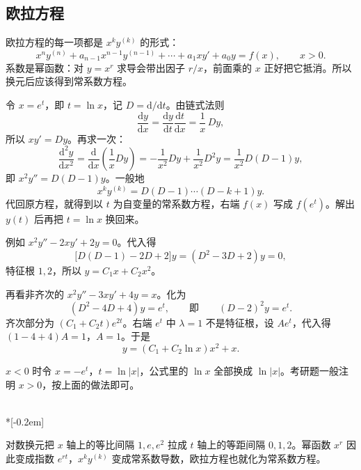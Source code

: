 \subsection{欧拉方程}

欧拉方程的每一项都是 $x^ky^{(k)}$ 的形式：
\[
  x^ny^{(n)}+a_{n-1}x^{n-1}y^{(n-1)}+\cdots+a_1xy'+a_0y=f(x),
  \qquad x>0.
\]
系数是幂函数：对 $y=x^r$ 求导会带出因子 $r/x$，前面乘的 $x$ 正好把它抵消。所以换元后应该得到常系数方程。

令 $x=e^t$，即 $t=\ln x$，记 $D=\mathrm{d}/\mathrm{d}t$。由链式法则
\[
  \frac{\mathrm{d}y}{\mathrm{d}x}
  =\frac{\mathrm{d}y}{\mathrm{d}t}\frac{\mathrm{d}t}{\mathrm{d}x}
  =\frac1x\,Dy,
\]
所以 $xy'=Dy$。再求一次：
\[
  \frac{\mathrm{d}^2y}{\mathrm{d}x^2}
  =\frac{\mathrm{d}}{\mathrm{d}x}\left(\frac1x Dy\right)
  =-\frac1{x^2}Dy+\frac1{x^2}D^2y
  =\frac1{x^2}D(D-1)y,
\]
即 $x^2y''=D(D-1)y$。一般地
\[
  x^ky^{(k)}=D(D-1)\cdots(D-k+1)y.
\]
代回原方程，就得到以 $t$ 为自变量的常系数方程，右端 $f(x)$ 写成 $f(e^t)$。解出 $y(t)$ 后再把 $t=\ln x$ 换回来。

例如 $x^2y''-2xy'+2y=0$。代入得
\[
  \bigl[D(D-1)-2D+2\bigr]y=(D^2-3D+2)y=0,
\]
特征根 $1,2$，所以 $y=C_1x+C_2x^2$。

再看非齐次的 $x^2y''-3xy'+4y=x$。化为
\[
  (D^2-4D+4)y=e^t,
  \qquad\text{即}\qquad (D-2)^2y=e^t.
\]
齐次部分为 $(C_1+C_2t)e^{2t}$。右端 $e^t$ 中 $\lambda=1$ 不是特征根，设 $Ae^t$，代入得 $(1-4+4)A=1$，$A=1$。于是
\[
  y=(C_1+C_2\ln x)x^2+x.
\]

$x<0$ 时令 $x=-e^t$，$t=\ln|x|$，公式里的 $\ln x$ 全部换成 $\ln|x|$。考研题一般注明 $x>0$，按上面的做法即可。

\begin{center}
\\*[-0.2em]
\parbox{0.88\linewidth}{\centering\footnotesize
对数换元把 $x$ 轴上的等比间隔 $1,e,e^2$ 拉成 $t$ 轴上的等距间隔 $0,1,2$。幂函数 $x^r$ 因此变成指数 $e^{rt}$，$x^ky^{(k)}$ 变成常系数导数，欧拉方程也就化为常系数方程。}
\end{center}

